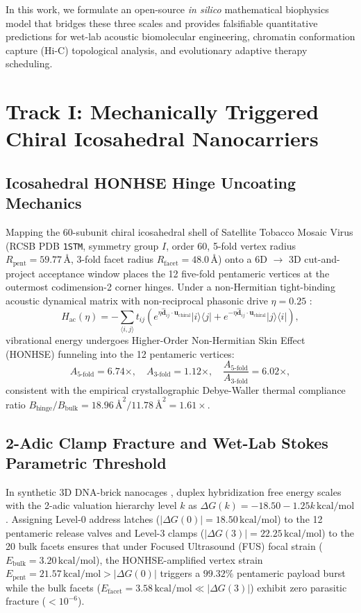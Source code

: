 \documentclass[aps,prx,twocolumn,superscriptaddress,longbibliography,nofootinbib]{revtex4-2}
\begin{document}
In this work, we formulate an open-source \textit{in silico} mathematical biophysics model that bridges these three scales and provides falsifiable quantitative predictions for wet-lab acoustic biomolecular engineering, chromatin conformation capture (Hi-C) topological analysis, and evolutionary adaptive therapy scheduling.

\section{Track I: Mechanically Triggered Chiral Icosahedral Nanocarriers}
\subsection{Icosahedral HONHSE Hinge Uncoating Mechanics}
Mapping the 60-subunit chiral icosahedral shell of Satellite Tobacco Mosaic Virus (RCSB PDB \texttt{1STM}, symmetry group $I$, order 60, 5-fold vertex radius $R_{\mathrm{pent}} = 59.77\,\text{\AA}$, 3-fold facet radius $R_{\mathrm{facet}} = 48.0\,\text{\AA}$) \cite{Larson1993,Twarock2004} onto a 6D $\to$ 3D cut-and-project acceptance window places the 12 five-fold pentameric vertices at the outermost codimension-2 corner hinges. Under a non-Hermitian tight-binding acoustic dynamical matrix with non-reciprocal phasonic drive $\eta = 0.25$ \cite{YaoWang2018,Okuma2020}:
\begin{equation}
H_{\mathrm{ac}}(\eta) = -\sum_{\langle i,j \rangle} t_{ij} \left( e^{\eta \hat{\bm{d}}_{ij}\cdot\bm{u}_{\mathrm{chiral}}} |i\rangle\langle j| + e^{-\eta \hat{\bm{d}}_{ij}\cdot\bm{u}_{\mathrm{chiral}}} |j\rangle\langle i| \right),
\end{equation}
vibrational energy undergoes Higher-Order Non-Hermitian Skin Effect (HONHSE) funneling into the 12 pentameric vertices:
\begin{equation}
A_{5\text{-fold}} = 6.74\times, \quad A_{3\text{-fold}} = 1.12\times, \quad \frac{A_{5\text{-fold}}}{A_{3\text{-fold}}} = 6.02\times,
\end{equation}
consistent with the empirical crystallographic Debye-Waller thermal compliance ratio $B_{\mathrm{hinge}}/B_{\mathrm{bulk}} = 18.96\,\text{\AA}^2 / 11.78\,\text{\AA}^2 = 1.61\times$.

\subsection{2-Adic Clamp Fracture and Wet-Lab Stokes Parametric Threshold}
In synthetic 3D DNA-brick nanocages \cite{Ke2012}, duplex hybridization free energy scales with the 2-adic valuation hierarchy level $k$ as $\Delta G(k) = -18.50 - 1.25k\,\mathrm{kcal/mol}$. Assigning Level-0 address latches ($|\Delta G(0)| = 18.50\,\mathrm{kcal/mol}$) to the 12 pentameric release valves and Level-3 clamps ($|\Delta G(3)| = 22.25\,\mathrm{kcal/mol}$) to the 20 bulk facets ensures that under Focused Ultrasound (FUS) focal strain ($E_{\mathrm{bulk}} = 3.20\,\mathrm{kcal/mol}$), the HONHSE-amplified vertex strain $E_{\mathrm{pent}} = 21.57\,\mathrm{kcal/mol} > |\Delta G(0)|$ triggers a $99.32\%$ pentameric payload burst while the bulk facets ($E_{\mathrm{facet}} = 3.58\,\mathrm{kcal/mol} \ll |\Delta G(3)|$) exhibit zero parasitic fracture ($< 10^{-6}$).
\end{document}

